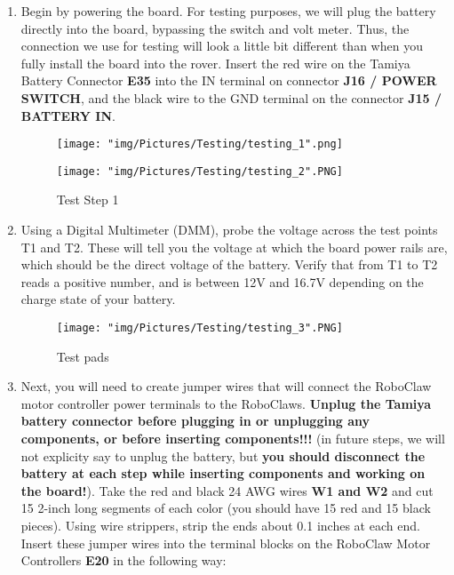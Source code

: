 \documentclass[12pt]{article}
\begin{document}
\begin{enumerate}

\item Begin by powering the board. For testing purposes, we will plug the battery directly into the board, bypassing the switch and volt meter.  Thus, the connection we use for testing will look a little bit different than when you fully install the board into the rover. Insert the red wire on the Tamiya Battery Connector \textbf{E35} into the IN terminal on connector \textbf{J16 / POWER SWITCH}, and the black wire to the GND terminal on the connector \textbf{J15 / BATTERY IN}.

\begin{figure}[H]
  \centering
  \begin{minipage}[b]{0.45\textwidth}
    \texttt{[image: "img/Pictures/Testing/testing\_1".png]}
  \end{minipage}
  \hfill
  \begin{minipage}[b]{0.45\textwidth}
    \texttt{[image: "img/Pictures/Testing/testing\_2".PNG]}
  \end{minipage}
  \caption{Test Step 1}
  \label{test_1}
\end{figure}

\item Using a Digital Multimeter (DMM), probe the voltage across the test points T1 and T2. These will tell you the voltage at which the board power rails are, which should be the direct voltage of the battery. Verify that from T1 to T2 reads a positive number, and is between 12V and 16.7V depending on the charge state of your battery. 

\begin{figure}[H]
  \centering
    \texttt{[image: "img/Pictures/Testing/testing\_3".PNG]}
  \caption{Test pads}
  \label{test_pads_1}
\end{figure}

\item Next, you will need to create jumper wires that will connect the RoboClaw motor controller power terminals to the RoboClaws. \textbf{Unplug the Tamiya battery connector before plugging in or unplugging any components, or before inserting components!!!}  (in future steps, we will not explicity say to unplug the battery, but \textbf{you should disconnect the battery at each step while inserting components and working on the board!}). Take the red and black 24 AWG wires \textbf{W1 and W2} and cut 15 2-inch long segments of each color (you should have 15 red and 15 black pieces). Using wire strippers, strip the ends about 0.1 inches at each end. Insert these jumper wires into the terminal blocks on the RoboClaw Motor Controllers \textbf{E20} in the following way:


\end{enumerate}
\end{document}
